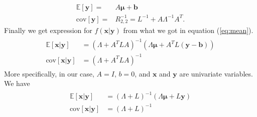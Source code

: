 {\begin{align}
\mathbb{E}[\mathbf{y}]= & A\mathbf{\mu}+\mathbf{b}\\
\text{cov}[\mathbf{y}]= & R_{2,2}^{-1}=L^{-1}+A\Lambda^{-1}A^T. 
\end{align}
Finally we get expression for $f(\mathbf{x}|\mathbf{y})$ from what we got in equation (\ref{eq:mean}).
\begin{align}
\begin{split}
\mathbb{E}[\mathbf{x}|\mathbf{y}] & = (\Lambda+A^TLA)^{-1}(\Lambda\mathbf{\mu}+A^TL(\mathbf{y}-\mathbf{b})) \\
\text{cov}[\mathbf{x}|\mathbf{y}] & = (\Lambda+A^TLA)^{-1}
\end{split}
\end{align}
More specifically, in our case, $A = I$, $b = 0$, and $\mathbf{x}$ and $\mathbf{y}$ are univariate variables. We have 
\begin{align}
\begin{split}
\mathbb{E}[\mathbf{x}|\mathbf{y}] & =(\Lambda+L)^{-1}(\Lambda\mathbf{\mu}+L\mathbf{y}) \\
\text{cov}[\mathbf{x}|\mathbf{y}] & = (\Lambda+L)^{-1}
\end{split}
\end{align}
}